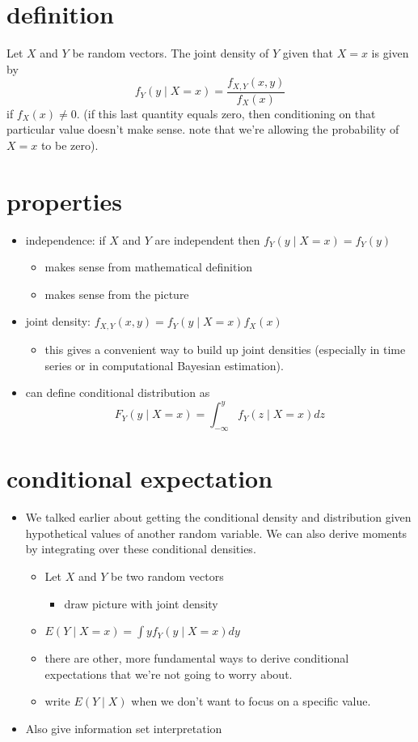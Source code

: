 \documentclass[11pt]{article}
\begin{document}
\section{definition}
\label{sec-2}

    Let $X$ and $Y$ be random vectors.  The joint density of $Y$
    given that $X = x$ is given by
    \[ f_Y(y \mid X = x) = \frac{f_{X,Y}(x, y)}{f_X(x)} \]
    if $f_X(x) \neq 0$.  (if this last quantity equals zero, then
    conditioning on that particular value doesn't make sense.  note
    that we're allowing the probability of $X=x$ to be zero).
\section{properties}
\label{sec-3}

\begin{itemize}
\item independence: if $X$ and $Y$ are independent then 
      $f_Y(y \mid X = x) = f_Y(y)$
\begin{itemize}
\item makes sense from mathematical definition
\item makes sense from the picture
\end{itemize}
\item joint density: $f_{X,Y}(x,y) = f_Y(y \mid X = x) f_X(x)$
\begin{itemize}
\item this gives a convenient way to build up joint densities
        (especially in time series or in computational Bayesian
        estimation).
\end{itemize}
\item can define conditional distribution as
      \[ F_Y(y \mid X=x) = \int_{-\infty}^y f_Y(z \mid X = x) dz \]
\end{itemize}
\section{conditional expectation}
\label{sec-4}

\begin{itemize}
\item We talked earlier about getting the conditional density and
      distribution given hypothetical values of another random variable.
      We can also derive moments by integrating over these conditional
      densities.
\begin{itemize}
\item Let $X$ and $Y$ be two random vectors
\begin{itemize}
\item draw picture with joint density
\end{itemize}
\item $E(Y \mid X = x) = \int y f_Y(y \mid X = x) dy$
\item there are other, more fundamental ways to derive conditional
         expectations that we're not going to worry about.
\item write $E(Y \mid X)$ when we don't want to focus on a specific
         value.
\end{itemize}
\item Also give information set interpretation
\end{itemize}
\end{document}
